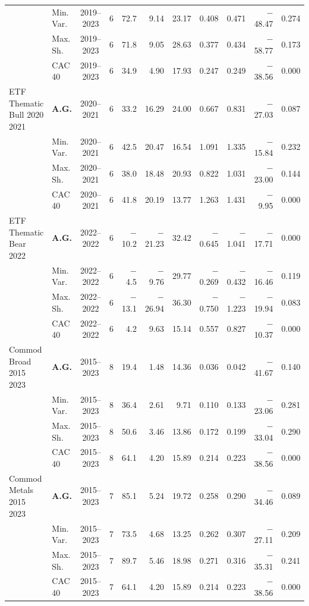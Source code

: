 \begin{longtable}{p{2.6cm} l c c r r r r r r r}
 & Min.\,Var. & 2019--2023 & 6 & 72.7 & 9.14 & 23.17 & 0.408 & 0.471 & $-$48.47 & 0.274 \\
 & Max.\,Sh. & 2019--2023 & 6 & 71.8 & 9.05 & 28.63 & 0.377 & 0.434 & $-$58.77 & 0.173 \\
 & CAC 40 & 2019--2023 & 6 & 34.9 & 4.90 & 17.93 & 0.247 & 0.249 & $-$38.56 & 0.000 \\
\midrule
ETF Thematic Bull 2020 2021 & \textbf{A.G.} & 2020--2021 & 6 & 33.2 & 16.29 & 24.00 & 0.667 & 0.831 & $-$27.03 & 0.087 \\
 & Min.\,Var. & 2020--2021 & 6 & 42.5 & 20.47 & 16.54 & 1.091 & 1.335 & $-$15.84 & 0.232 \\
 & Max.\,Sh. & 2020--2021 & 6 & 38.0 & 18.48 & 20.93 & 0.822 & 1.031 & $-$23.00 & 0.144 \\
 & CAC 40 & 2020--2021 & 6 & 41.8 & 20.19 & 13.77 & 1.263 & 1.431 & $-$9.95 & 0.000 \\
\midrule
ETF Thematic Bear 2022 & \textbf{A.G.} & 2022--2022 & 6 & $-$10.2 & $-$21.23 & 32.42 & $-$0.645 & $-$1.041 & $-$17.71 & 0.000 \\
 & Min.\,Var. & 2022--2022 & 6 & $-$4.5 & $-$9.76 & 29.77 & $-$0.269 & $-$0.432 & $-$16.46 & 0.119 \\
 & Max.\,Sh. & 2022--2022 & 6 & $-$13.1 & $-$26.94 & 36.30 & $-$0.750 & $-$1.223 & $-$19.94 & 0.083 \\
 & CAC 40 & 2022--2022 & 6 & 4.2 & 9.63 & 15.14 & 0.557 & 0.827 & $-$10.37 & 0.000 \\
\midrule
Commod Broad 2015 2023 & \textbf{A.G.} & 2015--2023 & 8 & 19.4 & 1.48 & 14.36 & 0.036 & 0.042 & $-$41.67 & 0.140 \\
 & Min.\,Var. & 2015--2023 & 8 & 36.4 & 2.61 & 9.71 & 0.110 & 0.133 & $-$23.06 & 0.281 \\
 & Max.\,Sh. & 2015--2023 & 8 & 50.6 & 3.46 & 13.86 & 0.172 & 0.199 & $-$33.04 & 0.290 \\
 & CAC 40 & 2015--2023 & 8 & 64.1 & 4.20 & 15.89 & 0.214 & 0.223 & $-$38.56 & 0.000 \\
\midrule
Commod Metals 2015 2023 & \textbf{A.G.} & 2015--2023 & 7 & 85.1 & 5.24 & 19.72 & 0.258 & 0.290 & $-$34.46 & 0.089 \\
 & Min.\,Var. & 2015--2023 & 7 & 73.5 & 4.68 & 13.25 & 0.262 & 0.307 & $-$27.11 & 0.209 \\
 & Max.\,Sh. & 2015--2023 & 7 & 89.7 & 5.46 & 18.98 & 0.271 & 0.316 & $-$35.31 & 0.241 \\
 & CAC 40 & 2015--2023 & 7 & 64.1 & 4.20 & 15.89 & 0.214 & 0.223 & $-$38.56 & 0.000 \\

\end{longtable}
